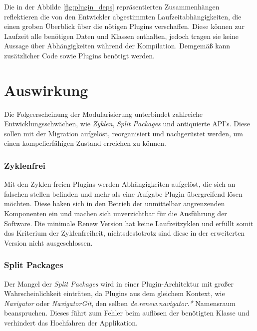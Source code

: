 Die in der Abbilde \ref{fig:plugin_deps} repräsentierten Zusammenhängen reflektieren die von den Entwickler abgestimmten Laufzeitabhängigkeiten, die einen groben Überblick über die nötigen Plugins verschaffen. Diese können zur Laufzeit alle benötigen Daten und Klassen enthalten, jedoch tragen sie keine Aussage über Abhängigkeiten während der Kompilation. Demgemäß kann zusätzlicher Code sowie Plugins benötigt werden. 


\section{Auswirkung} \label{auswirkung}
Die Folgeerscheinung der Modularisierung unterbindet zahlreiche Entwicklungsschwächen, wie \textit{Zyklen}, \textit{Split Packages} und antiquierte API's. Diese sollen mit der Migration aufgelöst, reorganisiert und nachgerüstet werden, um einen kompelierfähigen Zustand erreichen zu können.

\subsubsection{Zyklenfrei} 
Mit den Zyklen-freien Plugins werden Abhängigkeiten aufgelöst, die sich an falschen stellen befinden und mehr als eine Aufgabe Plugin übergreifend lösen möchten. Diese haken sich in den Betrieb der unmittelbar angrenzenden Komponenten ein und machen sich unverzichtbar für die Ausführung der Software. Die minimale Renew Version hat keine Laufzeitzyklen und erfüllt somit das Kriterium der Zyklenfreiheit, nichtsdestotrotz sind diese in der erweiterten Version nicht ausgeschlossen.

\subsubsection{Split Packages}
Der Mangel der \textit{Split Packages} wird in einer Plugin-Architektur mit großer Wahrscheinlichkeit einträten, da Plugins aus dem gleichem Kontext, wie \textit{Navigator} oder \textit{NavigatorGit}, den selben \textit{de.renew.navigator.*} Namensraum beanspruchen. Dieses führt zum Fehler beim auflösen der benötigten Klasse und verhindert das Hochfahren der Applikation. 

